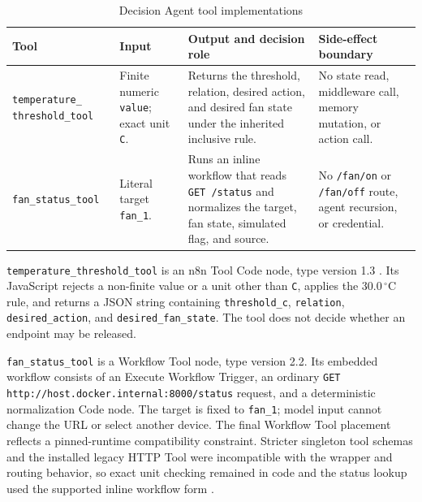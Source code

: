 \begin{table}[H]
\centering
\caption{Decision Agent tool implementations}
\label{tab:impl-tools}

\begingroup
\small
\setlength{\tabcolsep}{3.5pt}
\renewcommand{\arraystretch}{1.15}

\begin{tabularx}{\textwidth}{
  @{}
  L{0.24\textwidth}
  L{0.19\textwidth}
  Y
  L{0.22\textwidth}
  @{}
}
\toprule
\textbf{Tool}
&
\textbf{Input}
&
\textbf{Output and decision role}
&
\textbf{Side-effect boundary}
\\
\midrule

\texttt{temperature\_}\newline
\texttt{threshold\_tool}
&
Finite numeric \texttt{value}; exact unit \texttt{C}.
&
Returns the threshold, relation, desired action, and desired fan state
under the inherited inclusive rule.
&
No state read, middleware call, memory mutation, or action call.
\\
\addlinespace[2pt]

\texttt{fan\_status\_tool}
&
Literal target \texttt{fan\_1}.
&
Runs an inline workflow that reads \texttt{GET /status} and normalizes
the target, fan state, simulated flag, and source.
&
No \texttt{/fan/on} or \texttt{/fan/off} route, agent recursion, or
credential.
\\

\bottomrule
\end{tabularx}
\endgroup
\end{table}

\texttt{temperature\_threshold\_tool} is an n8n Tool Code node, type version
1.3 \cite{n8nCustomCodeTool}. Its JavaScript rejects a non-finite value or a unit other than
\texttt{C}, applies the $30.0\,^{\circ}\mathrm{C}$ rule, and returns a JSON
string containing \texttt{threshold\_c}, \texttt{relation},
\texttt{desired\_action}, and \texttt{desired\_fan\_state}. The tool does not
decide whether an endpoint may be released.

\texttt{fan\_status\_tool} is a Workflow Tool node, type version 2.2. Its
embedded workflow consists of an Execute Workflow Trigger, an ordinary
\texttt{GET http://host.docker.internal:8000/status} request, and a
deterministic normalization Code node. The target is fixed to
\texttt{fan\_1}; model input cannot change the URL or select another device.
The final Workflow Tool placement reflects a pinned-runtime compatibility
constraint. Stricter singleton tool schemas and the installed legacy HTTP
Tool were incompatible with the wrapper and routing behavior, so exact unit
checking remained in code and the status lookup used the supported inline
workflow form \cite{n8nWorkflowTool}.

